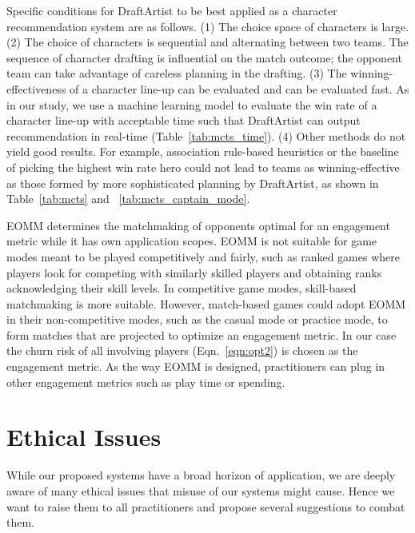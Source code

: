 Specific conditions for DraftArtist to be best applied as a character recommendation system are as follows. (1) The choice space of characters is large. (2) The choice of characters is sequential and alternating between two teams. The sequence of character drafting is influential on the match outcome; the opponent team can take advantage of careless planning in the drafting. (3) The winning-effectiveness of a character line-up can be evaluated and can be evaluated fast. As in our study, we use a machine learning model to evaluate the win rate of a character line-up with acceptable time such that DraftArtist can output recommendation in real-time (Table~\ref{tab:mcts_time}). (4) Other methods do not yield good results. For example, association rule-based heuristics or the baseline of picking the highest win rate hero could not lead to teams as winning-effective as those formed by more sophisticated planning by DraftArtist, as shown in Table~\ref{tab:mcts} and ~\ref{tab:mcts_captain_mode}.

EOMM determines the matchmaking of opponents optimal for an engagement metric while it has  own application scopes. EOMM is not suitable for game modes meant to be played competitively and fairly, such as ranked games where players look for competing with similarly skilled players and obtaining ranks acknowledging their skill levels. In competitive game modes, skill-based matchmaking is more suitable. However, match-based games could adopt EOMM in their non-competitive modes, such as the casual mode or practice mode, to form matches that are projected to optimize an engagement metric. In our case the churn risk of all involving players (Eqn.~\ref{eqn:opt2}) is chosen as the engagement metric. As the way EOMM is designed, practitioners can plug in other engagement metrics such as play time or spending. 



\section{Ethical Issues}\label{sec:ethical}
While our proposed systems have a broad horizon of application, we are deeply aware of many ethical issues that misuse of our systems might cause. Hence we want to raise them to all practitioners and propose several suggestions to combat them. 

